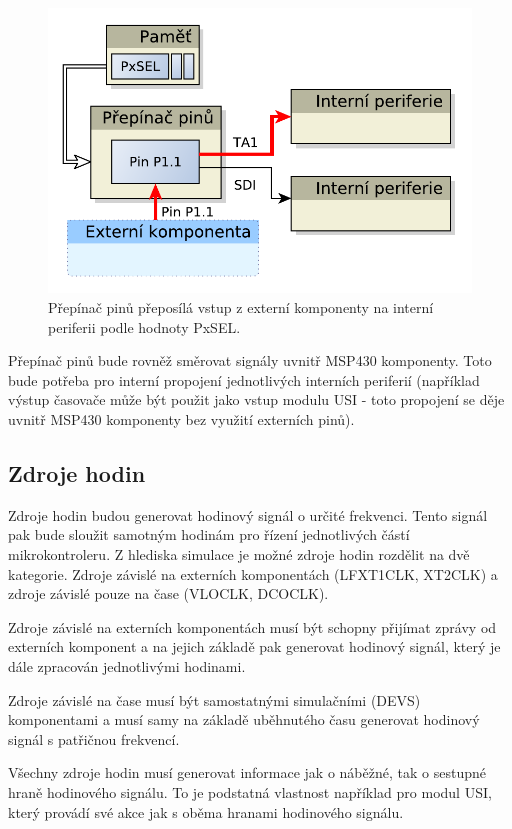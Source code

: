 \begin{figure}[h]
\centering
\includegraphics[trim=0cm 0cm 0cm 0cm, scale=0.7]{fig/msp430_pinmult}
\caption{Přepínač pinů přeposílá vstup z externí komponenty na interní periferii podle hodnoty PxSEL.}
\label{fig:msp430_pinmult}
\end{figure}

Přepínač pinů bude rovněž směrovat signály uvnitř MSP430 komponenty. Toto bude potřeba pro interní propojení jednotlivých interních periferií (například výstup časovače může být použit jako vstup modulu USI - toto propojení se děje uvnitř MSP430 komponenty bez využití externích pinů).

\subsection{Zdroje hodin}

Zdroje hodin budou generovat hodinový signál o určité frekvenci. Tento signál pak bude sloužit samotným hodinám pro řízení jednotlivých částí mikrokontroleru. Z hlediska simulace je možné zdroje hodin rozdělit na dvě kategorie. Zdroje závislé na externích komponentách (LFXT1CLK, XT2CLK) a zdroje závislé pouze na čase (VLOCLK, DCOCLK).

Zdroje závislé na externích komponentách musí být schopny přijímat zprávy od externích komponent a na jejich základě pak generovat hodinový signál, který je dále zpracován jednotlivými hodinami.

Zdroje závislé na čase musí být samostatnými simulačními (DEVS) komponentami a musí samy na základě uběhnutého času generovat hodinový signál s patřičnou frekvencí.

Všechny zdroje hodin musí generovat informace jak o náběžné, tak o sestupné hraně hodinového signálu. To je podstatná vlastnost například pro modul USI, který provádí své akce jak s oběma hranami hodinového signálu.

